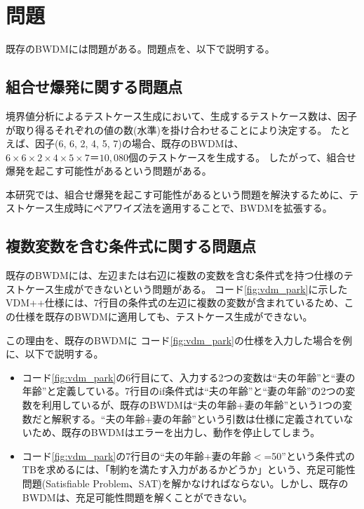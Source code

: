 \documentclass[uplatex, report, a4j, 10pt]{jsbook}
\begin{document}
\section{問題}\label{sec:bwdm_problem}
既存のBWDMには問題がある。問題点を、以下で説明する。

\subsection{組合せ爆発に関する問題点}\label{sec:problem_pairwise}
境界値分析によるテストケース生成において、生成するテストケース数は、因子が取り得るそれぞれの値の数(水準)を掛け合わせることにより決定する。
たとえば、因子(6, 6, 2, 4, 5, 7)の場合、既存のBWDMは、$6 \times 6 \times 2 \times 4 \times 5 \times 7＝10,080個$のテストケースを生成する。
したがって、組合せ爆発を起こす可能性があるという問題がある。

本研究では、組合せ爆発を起こす可能性があるという問題を解決するために、テストケース生成時にペアワイズ法を適用することで、BWDMを拡張する。

\subsection{複数変数を含む条件式に関する問題点}\label{sec:problem_double_var}

既存のBWDMには、左辺または右辺に複数の変数を含む条件式を持つ仕様のテストケース生成ができないという問題がある。
コード\ref{fig:vdm_park}に示したVDM++仕様には、7行目の条件式の左辺に複数の変数が含まれているため、この仕様を既存のBWDMに適用しても、テストケース生成ができない。

この理由を、既存のBWDMに コード\ref{fig:vdm_park}の仕様を入力した場合を例に、以下で説明する。

\begin{itemize}
  \item  コード\ref{fig:vdm_park}の6行目にて、入力する2つの変数は“夫の年齢”と“妻の年齢”と定義している。7行目のif条件式は“夫の年齢”と“妻の年齢”の2つの変数を利用しているが、既存のBWDMは“夫の年齢+妻の年齢”という1つの変数だと解釈する。“夫の年齢+妻の年齢”という引数は仕様に定義されていないため、既存のBWDMはエラーを出力し、動作を停止してしまう。
  \item  コード\ref{fig:vdm_park}の7行目の“夫の年齢+妻の年齢$<$=50”という条件式のTBを求めるには、「制約を満たす入力があるかどうか」という、充足可能性問題(Satisfiable Problem、SAT)\cite{sat}を解かなければならない。しかし、既存のBWDMは、充足可能性問題を解くことができない。
\end{itemize}
\end{document}
